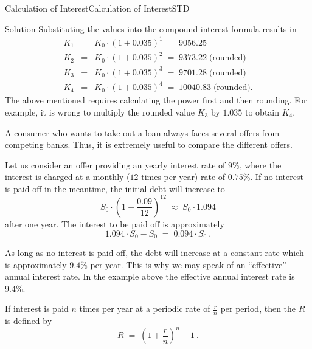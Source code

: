 \begin{MXContent}{Calculation of Interest}{Calculation of Interest}{STD}
\begin{MExercise}
\begin{MHint}{Solution}
Substituting the values into the compound interest formula results in
\begin{eqnarray*}
K_1 &=& K_0\cdot \left({1+0.035}\right)^1 \;=\; 9056.25\\
K_2 &=& K_0\cdot \left({1+0.035}\right)^2 \;=\; 9373.22\;\text{(rounded)}\\
K_3 &=& K_0\cdot \left({1+0.035}\right)^3 \;=\; 9701.28\;\text{(rounded)}\\
K_4 &=& K_0\cdot \left({1+0.035}\right)^4 \;=\; 10040.83\;\text{(rounded)}.
\end{eqnarray*}
The above mentioned  requires calculating the power first and then 
rounding. For example, it is wrong to multiply the rounded value $K_3$ by $1.035$ to obtain $K_4$.
\end{MHint}
\end{MExercise}

A consumer who wants to take out a loan always faces several offers from competing banks. Thus, it is extremely useful to 
compare the different offers.

\begin{MExample}
Let us consider an offer providing an yearly interest rate of $9\%$, where the interest is charged at
a monthly ($12$ times per year) rate of $0.75\%$. If no interest is paid off in the meantime, 
the initial debt will increase to
$$
S_{0}\cdot \left({1+\frac{0.09}{12} }\right)^{12}\; \approx \; S_{0}\cdot 1.094
$$
after one year. The interest to be paid off is approximately
$$
1.094 \cdot S_{0}-S_{0}\; =\; 0.094 \cdot S_{0}\: .
$$
\end{MExample}

As long as no interest is paid off, the debt will increase at a constant rate which is approximately 
$9.4\%$ per year. This is why we may speak of an ``effective'' annual interest rate. In the example above the 
effective annual interest rate is $9.4\%$.


\begin{MInfo}
If interest is paid $n$ times per year at a periodic rate of $\frac{r}{n}$ per period, then the 
 $R$ is defined by 
$$
R\; =\;\left({ 1+\frac{r}{n}}\right)^{n}-1\: .
$$
\end{MInfo}

\end{MXContent}

